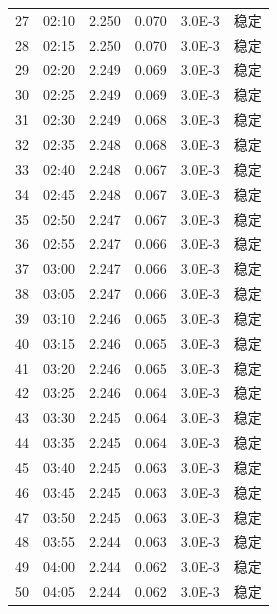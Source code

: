 {\begin{longtable}{cccccc}
27&02:10&2.250&0.070&3.0E-3&稳定\\
28&02:15&2.250&0.070&3.0E-3&稳定\\
29&02:20&2.249&0.069&3.0E-3&稳定\\
30&02:25&2.249&0.069&3.0E-3&稳定\\
31&02:30&2.249&0.068&3.0E-3&稳定\\
32&02:35&2.248&0.068&3.0E-3&稳定\\
33&02:40&2.248&0.067&3.0E-3&稳定\\
34&02:45&2.248&0.067&3.0E-3&稳定\\
35&02:50&2.247&0.067&3.0E-3&稳定\\
36&02:55&2.247&0.066&3.0E-3&稳定\\
37&03:00&2.247&0.066&3.0E-3&稳定\\
38&03:05&2.247&0.066&3.0E-3&稳定\\
39&03:10&2.246&0.065&3.0E-3&稳定\\
40&03:15&2.246&0.065&3.0E-3&稳定\\
41&03:20&2.246&0.065&3.0E-3&稳定\\
42&03:25&2.246&0.064&3.0E-3&稳定\\
43&03:30&2.245&0.064&3.0E-3&稳定\\
44&03:35&2.245&0.064&3.0E-3&稳定\\
45&03:40&2.245&0.063&3.0E-3&稳定\\
46&03:45&2.245&0.063&3.0E-3&稳定\\
47&03:50&2.245&0.063&3.0E-3&稳定\\
48&03:55&2.244&0.063&3.0E-3&稳定\\
49&04:00&2.244&0.062&3.0E-3&稳定\\
50&04:05&2.244&0.062&3.0E-3&稳定\\
\end{longtable}
}
